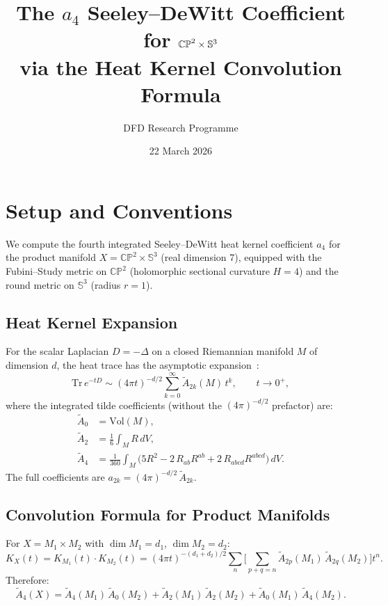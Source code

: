 \documentclass[11pt]{article}
\title{The $a_4$ Seeley--DeWitt Coefficient for $\CP^2 \times \Sph^3$ \\
via the Heat Kernel Convolution Formula}
\author{DFD Research Programme}
\date{22 March 2026}
\newcommand{\CP}{\mathbb{CP}}
\newcommand{\Sph}{\mathbb{S}}
\newcommand{\Vol}{\mathrm{Vol}}
\begin{document}
\maketitle

\section{Setup and Conventions}

We compute the fourth integrated Seeley--DeWitt heat kernel coefficient
$a_4$ for the product manifold $X = \CP^2 \times \Sph^3$ (real dimension 7),
equipped with the Fubini--Study metric on $\CP^2$ (holomorphic sectional
curvature $H = 4$) and the round metric on $\Sph^3$ (radius $r = 1$).

\subsection{Heat Kernel Expansion}

For the scalar Laplacian $D = -\Delta$ on a closed Riemannian manifold $M$
of dimension $d$, the heat trace has the asymptotic expansion~\cite{Vassilevich2003,Gilkey1995}:
\begin{equation}
  \mathrm{Tr}\, e^{-tD} \sim (4\pi t)^{-d/2} \sum_{k=0}^{\infty}
  \widetilde{A}_{2k}(M)\, t^k, \qquad t \to 0^+,
\end{equation}
where the integrated tilde coefficients (without the $(4\pi)^{-d/2}$ prefactor) are:
\begin{align}
  \widetilde{A}_0 &= \Vol(M), \\
  \widetilde{A}_2 &= \frac{1}{6} \int_M R\, dV, \\
  \widetilde{A}_4 &= \frac{1}{360} \int_M
    \bigl(5R^2 - 2\,R_{ab}R^{ab} + 2\,R_{abcd}R^{abcd}\bigr)\, dV.
\end{align}
The full coefficients are $a_{2k} = (4\pi)^{-d/2}\, \widetilde{A}_{2k}$.

\subsection{Convolution Formula for Product Manifolds}

For $X = M_1 \times M_2$ with $\dim M_1 = d_1$, $\dim M_2 = d_2$:
\begin{equation}
  K_X(t) = K_{M_1}(t) \cdot K_{M_2}(t)
  = (4\pi t)^{-(d_1+d_2)/2} \sum_n
  \Biggl[\sum_{p+q=n} \widetilde{A}_{2p}(M_1)\,\widetilde{A}_{2q}(M_2)\Biggr] t^n.
\end{equation}
Therefore:
\begin{equation}\label{eq:convolution}
  \boxed{\widetilde{A}_{4}(X)
  = \widetilde{A}_4(M_1)\,\widetilde{A}_0(M_2)
  + \widetilde{A}_2(M_1)\,\widetilde{A}_2(M_2)
  + \widetilde{A}_0(M_1)\,\widetilde{A}_4(M_2).}
\end{equation}
\end{document}
